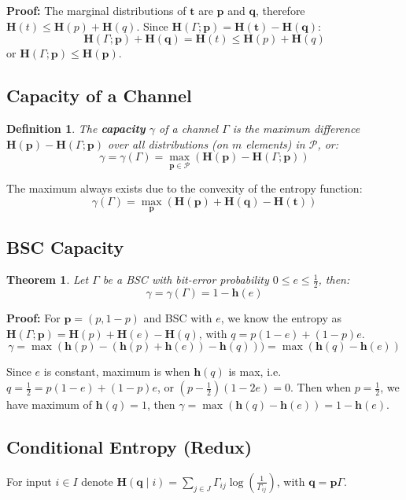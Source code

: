 \documentclass[11pt]{article}
\newtheorem{defn}{Definition}
\newtheorem{theo}{Theorem}
\begin{document}
\textbf{Proof:}
The marginal distributions of $\textbf{t}$ are $\textbf{p}$ and $\textbf{q}$, therefore $\textbf{H}(t) \leq \textbf{H}(p) + \textbf{H}(q)$.
Since $\textbf{H}(\Gamma ; \textbf{p}) = \textbf{H}(\textbf{t}) -  \textbf{H}(\textbf{q})$:
\[
  \textbf{H}(\Gamma ; \textbf{p}) + \textbf{H}(\textbf{q}) = \textbf{H}(t) \leq \textbf{H}(p) + \textbf{H}(q)
\]
or $\textbf{H}(\Gamma ; \textbf{p}) \leq \textbf{H}(\textbf{p})$.

\subsection{Capacity of a Channel}
\begin{defn}
  The \textbf{capacity} $\gamma$ of a channel $\Gamma$ is the maximum difference $\textbf{H}(\textbf{p}) - \textbf{H}(\Gamma ; \textbf{p})$ over all distributions (on $m$ elements) in $\mathcal{P}$, or:
  \[
    \gamma = \gamma(\Gamma) = \max_{\textbf{p} \in \mathcal{P}} (\textbf{H}(\textbf{p}) - \textbf{H}(\Gamma ; \textbf{p}))
  \]
\end{defn}

The maximum always exists due to the convexity of the entropy function:
\[
  \gamma(\Gamma) = \max_{\textbf{p}} (\textbf{H}(\textbf{p}) + \textbf{H}(\textbf{q}) - \textbf{H}(\textbf{t}))
\]

\subsection{BSC Capacity}
\begin{theo}
  Let $\Gamma$ be a BSC with bit-error probability $0 \leq e \leq \frac{1}{2}$, then:
  \[
    \gamma = \gamma(\Gamma) = 1 - \textbf{h}(e)
  \]
\end{theo}

\textbf{Proof:}
For $\textbf{p} = (p, 1 - p)$ and BSC with $e$, we know the entropy as $\textbf{H}(\Gamma ; \textbf{p}) = \textbf{H}(p) + \textbf{H}(e) - \textbf{H}(q)$, with $q = p(1 - e) + (1 - p)e$.
\[
  \gamma = \max(\textbf{h}(p) - (\textbf{h}(p) + \textbf{h}(e)) -\textbf{h}(q))) = \max(\textbf{h}(q)- \textbf{h}(e))
\]

Since $e$ is constant, maximum is when $\textbf{h}(q)$ is max, i.e.\ $q = \frac{1}{2} = p(1 - e) + (1 - p)e$, or $(p -\frac{1}{2})(1 - 2e) = 0$.
Then when $p = \frac{1}{2}$, we have maximum of $\textbf{h}(q) = 1$, then $\gamma = \max(\textbf{h}(q)- \textbf{h}(e)) = 1 - \textbf{h}(e)$.

\subsection{Conditional Entropy (Redux)}
For input $i \in I$ denote $\textbf{H}(\textbf{q} \mid i) = \sum_{j \in J} \Gamma_{ij} \log (\frac{1}{\Gamma_{ij}})$, with $\textbf{q} = \textbf{p}\Gamma$.
\end{document}
